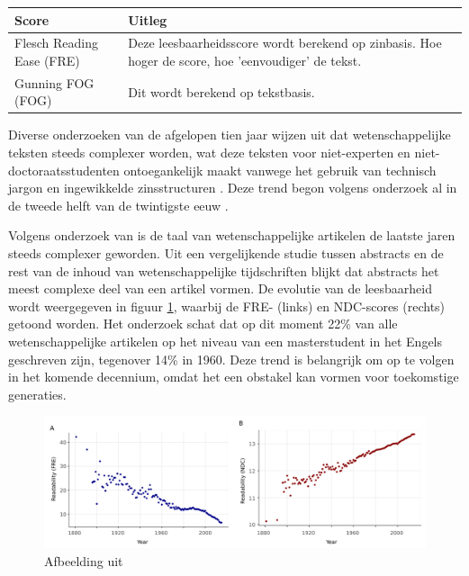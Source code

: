 \begin{center}
	\begin{tabular}{ | m{6cm} | m{10cm} | } 
		\hline
		\textbf{Score} & \textbf{Uitleg} \\ 
		\hline
		Flesch Reading Ease (FRE) & Deze leesbaarheidsscore wordt berekend op zinbasis. Hoe hoger de score, hoe 'eenvoudiger' de tekst. \\
		\hline
		Gunning FOG (FOG) & Dit wordt berekend op tekstbasis. \\
		\hline
	\end{tabular}
	\label{table:readability-scores}
\end{center}

\medspace

Diverse onderzoeken van de afgelopen tien jaar wijzen uit dat wetenschappelijke teksten steeds complexer worden, wat deze teksten voor niet-experten en niet-doctoraatsstudenten ontoegankelijk maakt vanwege het gebruik van technisch jargon en ingewikkelde zinsstructuren \autocite{Ball2017, PlavenSigray2017, Jones2019}. Deze trend begon volgens onderzoek al in de tweede helft van de twintigste eeuw \autocite{Hayes1992}.

\medspace

Volgens onderzoek van \textcite{PlavenSigray2017} is de taal van wetenschappelijke artikelen de laatste jaren steeds complexer geworden. Uit een vergelijkende studie tussen abstracts en de rest van de inhoud van wetenschappelijke tijdschriften blijkt dat abstracts het meest complexe deel van een artikel vormen. De evolutie van de leesbaarheid wordt weergegeven in figuur \ref{img:fre-ndc}, waarbij de FRE- (links) en NDC-scores (rechts) getoond worden. Het onderzoek schat dat op dit moment 22\% van alle wetenschappelijke artikelen op het niveau van een masterstudent in het Engels geschreven zijn, tegenover 14\% in 1960. Deze trend is belangrijk om op te volgen in het komende decennium, omdat het een obstakel kan vormen voor toekomstige generaties.

\begin{figure}[H]
	\includegraphics[width=\linewidth]{img/fre-ndc.png}
	\caption{Afbeelding uit \textcite{PlavenSigray2017}}
	\label{img:fre-ndc}
\end{figure}

